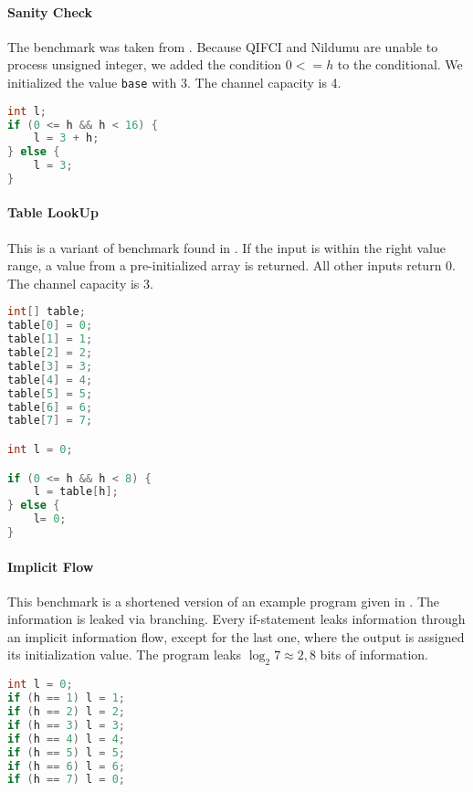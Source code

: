 \paragraph{Sanity Check}
The benchmark was taken from \cite{newsome09}. Because QIFCI and Nildumu are unable to process unsigned integer, we added the condition $0 <= h$ to the conditional. We initialized the value \texttt{base} with 3. The channel capacity is 4.

\begin{center}
    \begin{lstlisting}[language=C, caption=Sanity Check, captionpos=b]
int l;
if (0 <= h && h < 16) {
    l = 3 + h;
} else {
    l = 3;
}
    \end{lstlisting}
\end{center}

\paragraph{Table LookUp} This is a variant of benchmark found in \cite{newsome09}. If the input is within the right value range, a value from a pre-initialized array is returned. All other inputs return 0. The channel capacity is 3.

\begin{center}
    \begin{lstlisting}[language=C, caption=Table LookUp, captionpos=b]
int[] table;
table[0] = 0;
table[1] = 1;
table[2] = 2;
table[3] = 3;
table[4] = 4;
table[5] = 5;
table[6] = 6;
table[7] = 7;

int l = 0;

if (0 <= h && h < 8) {
    l = table[h];
} else {
    l= 0;
}
    \end{lstlisting}
\end{center}

\paragraph{Implicit Flow} This benchmark is a shortened version of an example program given in \cite{newsome09}. The information is leaked via branching. Every if-statement leaks information through an implicit information flow, except for the last one, where the output is assigned its initialization value. The program leaks $\log_2 7 \approx 2,8$ bits of information.

\begin{center}
    \begin{lstlisting}[language=C, caption=Implicit Flow, captionpos=b]
int l = 0;
if (h == 1) l = 1;
if (h == 2) l = 2;
if (h == 3) l = 3;
if (h == 4) l = 4;
if (h == 5) l = 5;
if (h == 6) l = 6;
if (h == 7) l = 0;
    \end{lstlisting}
\end{center}

